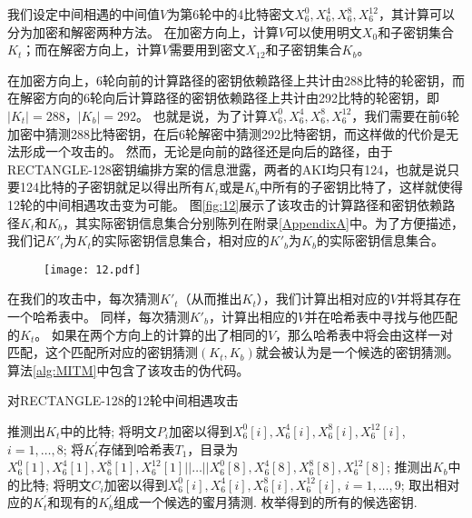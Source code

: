 我们设定中间相遇的中间值$V$为第6轮中的4比特密文$X_6^0,X_6^4,X_6^8,X_6^{12}$，其计算可以分为加密和解密两种方法。
在加密方向上，计算$V$可以使用明文$X_0$和子密钥集合$K_t$；而在解密方向上，计算$V$需要用到密文$X_{12}$和子密钥集合$K_b$。

在加密方向上，6轮向前的计算路径的密钥依赖路径上共计由288比特的轮密钥，而在解密方向的6轮向后计算路径的密钥依赖路径上共计由292比特的轮密钥，即$|K_t|=288$，$|K_b|=292$。
也就是说，为了计算$X_6^0,X_6^4,X_6^8,X_6^{12}$，我们需要在前6轮加密中猜测288比特密钥，在后6轮解密中猜测292比特密钥，而这样做的代价是无法形成一个攻击的。
然而，无论是向前的路径还是向后的路径，由于RECTANGLE-128密钥编排方案的信息泄露，两者的AKI均只有124，也就是说只要124比特的子密钥就足以得出所有$K_t$或是$K_b$中所有的子密钥比特了，这样就使得12轮的中间相遇攻击变为可能。
图\ref{fig:12}展示了该攻击的计算路径和密钥依赖路径$K_t$和$K_b$，其实际密钥信息集合分别陈列在附录\ref{AppendixA}中。为了方便描述，我们记$K'_t$为$K_t$的实际密钥信息集合，相对应的$K'_b$为$K_b$的实际密钥信息集合。
\begin{figure}
\centering
\texttt{[image: 12.pdf]}
\end{figure}
 
在我们的攻击中，每次猜测$K'_t$（从而推出$K_t$），我们计算出相对应的$V$并将其存在一个哈希表中。
同样，每次猜测$K'_b$，计算出相应的$V$并在哈希表中寻找与他匹配的$K_t$。
如果在两个方向上的计算的出了相同的$V$，那么哈希表中将会由这样一对匹配，这个匹配所对应的密钥猜测$(K_t,K_b)$就会被认为是一个候选的密钥猜测。
算法\ref{alg:MITM}中包含了该攻击的伪代码。
\begin{algorithm}
\footnotesize
\caption{对RECTANGLE-128的12轮中间相遇攻击}
\label{alg:MITM}
\begin{algorithmic}[1]
\State 推测出$K_t$中的比特;
\State 将明文$P_i$加密以得到$X_6^0[i],X_6^4[i],X_6^8[i],X_6^{12}[i]$, $i=1,\dots,8$;
\State 将$K^{\prime}_t$存储到哈希表$T_1$，目录为$X_6^0[1],X_6^4[1],X_6^8[1],X_6^{12}[1]||\dots||X_6^0[8],X_6^4[8],X_6^8[8],X_6^{12}[8]$;
\EndFor
{}
\State 推测出$K_b$中的比特;
\State 将明文$C_i$加密以得到$X_6^0[i],X_6^4[i],X_6^8[i],X_6^{12}[i]$, $i=1,\dots,9$;
\State 取出相对应的$K^{\prime}_t$和现有的$K^{\prime}_b$组成一个候选的蜜月猜测.
\EndIf
\EndFor
\State 枚举得到的所有的候选密钥.
\end{algorithmic}
\end{algorithm}

